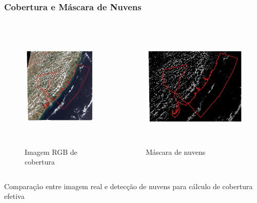 \documentclass{beamer}
\begin{document}
\begin{frame}
    \frametitle{Cobertura e Máscara de Nuvens}
    \begin{columns}
        \begin{figure}
            \includegraphics[width=\linewidth,height=6cm,keepaspectratio]{images/cobertura-rgb.png}
            \caption{\footnotesize Imagem RGB de cobertura}
        \end{figure}
        
        \begin{figure}
            \includegraphics[width=\linewidth,height=6cm,keepaspectratio]{images/cobertura-mask.png}
            \caption{\footnotesize Máscara de nuvens}
        \end{figure}
    \end{columns}
    
    \centering
    \small Comparação entre imagem real e detecção de nuvens para cálculo de cobertura efetiva
\end{frame}
\end{document}
